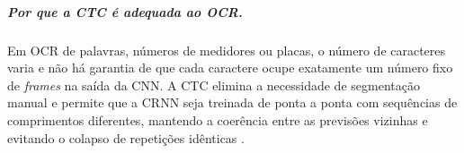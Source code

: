 \subparagraph{Por que a CTC é adequada ao OCR.}
Em OCR de palavras, números de medidores ou placas, 
o número de caracteres varia e não há garantia de que 
cada caractere ocupe exatamente um número fixo de \textit{frames} 
na saída da CNN. 
A CTC elimina a necessidade de segmentação manual e permite que a 
CRNN seja treinada de ponta a ponta com sequências de comprimentos diferentes, 
mantendo a coerência entre as previsões vizinhas e evitando 
o colapso de repetições idênticas \cite{shi2017crnn, graves2006ctc}.
